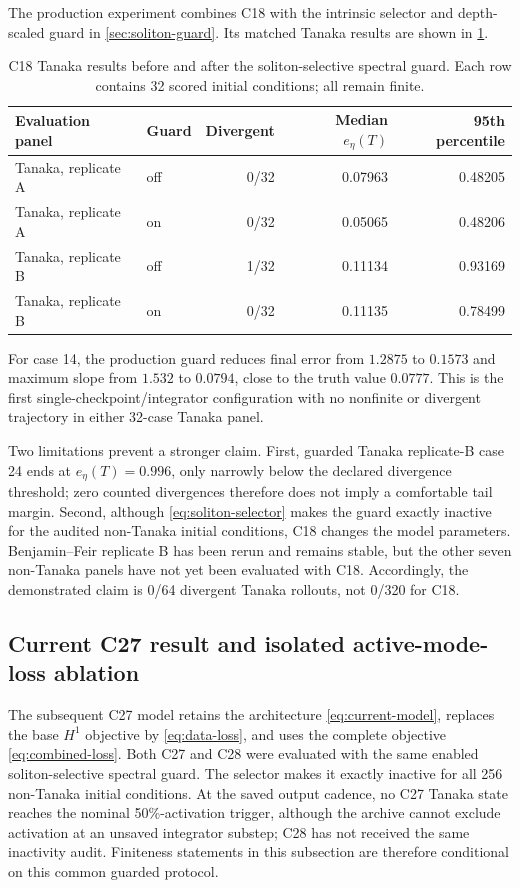 The production experiment combines C18 with the intrinsic selector and
depth-scaled guard in \cref{sec:soliton-guard}. Its matched Tanaka results are
shown in \cref{tab:c18-guard-results}.

\begin{table}[t]
  \centering
  \caption{C18 Tanaka results before and after the soliton-selective spectral
  guard. Each row contains 32 scored initial conditions; all remain finite.}
  \label{tab:c18-guard-results}
  \begin{tabular}{llrrr}
    \toprule
    Evaluation panel & Guard & Divergent & Median $e_\eta(T)$ & 95th percentile\\
    \midrule
    Tanaka, replicate A & off & 0/32 & 0.07963 & 0.48205\\
    Tanaka, replicate A & on  & 0/32 & 0.05065 & 0.48206\\
    Tanaka, replicate B & off & 1/32 & 0.11134 & 0.93169\\
    Tanaka, replicate B & on  & 0/32 & 0.11135 & 0.78499\\
    \bottomrule
  \end{tabular}
\end{table}

For case 14, the production guard reduces final error from $1.2875$ to
$0.1573$ and maximum slope from $1.532$ to $0.0794$, close to the truth value
$0.0777$. This is the first single-checkpoint/integrator configuration with no
nonfinite or divergent trajectory in either 32-case Tanaka panel.

Two limitations prevent a stronger claim. First, guarded Tanaka replicate-B case 24
ends at $e_\eta(T)=0.996$, only narrowly below the declared divergence
threshold; zero counted divergences therefore does not imply a comfortable
tail margin. Second, although \eqref{eq:soliton-selector} makes the guard
exactly inactive for the audited non-Tanaka initial conditions, C18 changes
the model parameters. Benjamin--Feir replicate B has been rerun and remains
stable, but the other seven non-Tanaka panels have not yet been evaluated with C18.
Accordingly, the demonstrated claim is 0/64 divergent Tanaka rollouts, not
0/320 for C18.

\subsection{Current C27 result and isolated active-mode-loss ablation}
\label{sec:mode-ablation}

The subsequent C27 model retains the architecture
\eqref{eq:current-model}, replaces the base $H^1$ objective by
\eqref{eq:data-loss}, and uses the complete objective
\eqref{eq:combined-loss}. Both C27 and C28 were evaluated with the same enabled
soliton-selective spectral guard. The selector makes it exactly inactive for
all 256 non-Tanaka initial conditions. At the saved output cadence, no C27
Tanaka state reaches the nominal 50\%-activation trigger, although the archive
cannot exclude activation at an unsaved integrator substep; C28 has not received
the same inactivity audit. Finiteness statements in this subsection are
therefore conditional on this common guarded protocol.

